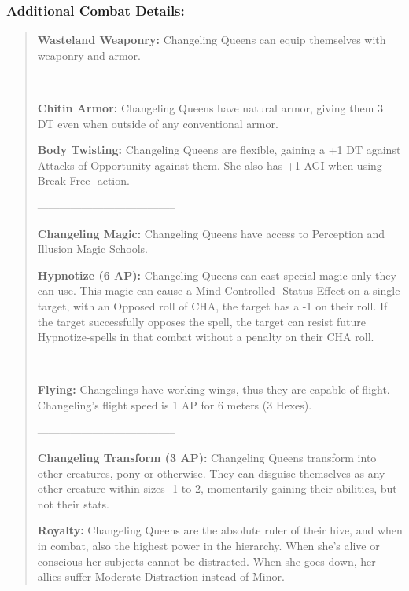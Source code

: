 \documentclass[11pt,a4paper,twocolumn]{book}
\begin{document}
	\subsubsection*{Additional Combat Details:}
	\begin{verse}
		
		\textbf{Wasteland Weaponry:} Changeling Queens can equip themselves with weaponry and armor.
		
		--------------------------------------
		
		\textbf{Chitin Armor:} Changeling Queens have natural armor, giving them 3 DT even when outside of any conventional armor.
		
		\textbf{Body Twisting:} Changeling Queens are flexible, gaining a +1 DT against Attacks of Opportunity against them. She also has +1 AGI when using Break Free -action.
		
		--------------------------------------
		
		\textbf{Changeling Magic:} Changeling Queens have access to Perception and Illusion Magic Schools.
		
		\textbf{Hypnotize (6 AP):} Changeling Queens can cast special magic only they can use. This magic can cause a Mind Controlled -Status Effect on a single target, with an Opposed roll of CHA, the target has a -1 on their roll. If the target successfully opposes the spell, the target can resist future Hypnotize-spells in that combat without a penalty on their CHA roll.
		
		--------------------------------------
		
		\textbf{Flying:} Changelings have working wings, thus they are capable of flight. Changeling's flight speed is 1 AP for 6 meters (3 Hexes).
		
		--------------------------------------		
		
		\textbf{Changeling Transform (3 AP):} Changeling Queens transform into other creatures, pony or otherwise. They can disguise themselves as any other creature within sizes -1 to 2, momentarily gaining their abilities, but not their stats.			 		
		
		\textbf{Royalty:} Changeling Queens are the absolute ruler of their hive, and when in combat, also the highest power in the hierarchy. When she's alive or conscious her subjects cannot be distracted. When she goes down, her allies suffer Moderate Distraction instead of Minor.
		
	\end{verse}
	
\end{document}
